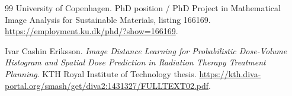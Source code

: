 \documentclass[11pt,a4paper]{article}
\begin{document}
\begin{thebibliography}{99}
University of Copenhagen. PhD position / PhD Project in Mathematical Image Analysis for Sustainable Materials, listing 166169. \href{https://employment.ku.dk/phd/?show=166169}{https://employment.ku.dk/phd/?show=166169}.

Ivar Cashin Eriksson. \emph{Image Distance Learning for Probabilistic Dose-Volume Histogram and Spatial Dose Prediction in Radiation Therapy Treatment Planning}. KTH Royal Institute of Technology thesis. \href{https://kth.diva-portal.org/smash/get/diva2:1431327/FULLTEXT02.pdf}{https://kth.diva-portal.org/smash/get/diva2:1431327/FULLTEXT02.pdf}.
\end{thebibliography}
\end{document}
